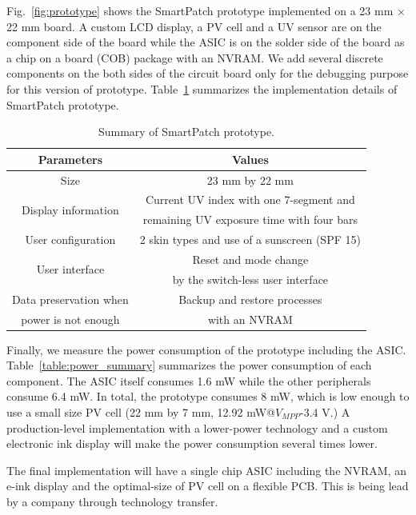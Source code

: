 \documentclass[journal]{IEEEtran}
\begin{document}
Fig.~\ref{fig:prototype} shows the SmartPatch prototype implemented on a 23 mm $\times$ 22 mm board.
A custom LCD display, a PV cell and a UV sensor are on the component side of the board while the ASIC is on the solder side of the board as a chip on a board (COB) package with an NVRAM.
We add several discrete components on the both sides of the circuit board only for the debugging purpose for this version of prototype.
Table~\ref{table:prototype_summary} summarizes the implementation details of SmartPatch prototype.

\begin{table}
\centering
\caption{Summary of SmartPatch prototype.}
\label{table:prototype_summary}
\begin{tabular}{|c|c|}  \hline
Parameters			&Values	\\ \hline \hline
Size					&23 mm by 22 mm  \\ \hline
\multirow{2}{*}{Display information}	&Current UV index with one 7-segment and\\
					&remaining UV exposure time with four bars \\ \hline
User configuration		&2 skin types and use of a sunscreen (SPF 15) \\ \hline
\multirow{2}{*}{User interface}	&Reset and mode change  \\
					&by the switch-less user interface \\ \hline
Data preservation when 	&Backup and restore processes  \\
power is not enough	&with an NVRAM \\ \hline
\end{tabular}
\end{table}

Finally, we measure the power consumption of the prototype including the ASIC.
Table~\ref{table:power_summary} summarizes the power consumption of each component.
The ASIC itself consumes 1.6 mW while the other peripherals consume 6.4 mW.
In total, the prototype consumes 8 mW, which is low enough to use a small size PV cell (22 mm by 7 mm, 12.92 mW@$V_{MPP}$-3.4 V.)
A production-level implementation with a lower-power technology and a custom electronic ink display will make the power consumption several times lower.

The final implementation will have a single chip ASIC including the NVRAM, an e-ink display and the optimal-size of PV cell on a flexible PCB. This is being lead by a company through technology transfer.
\end{document}
